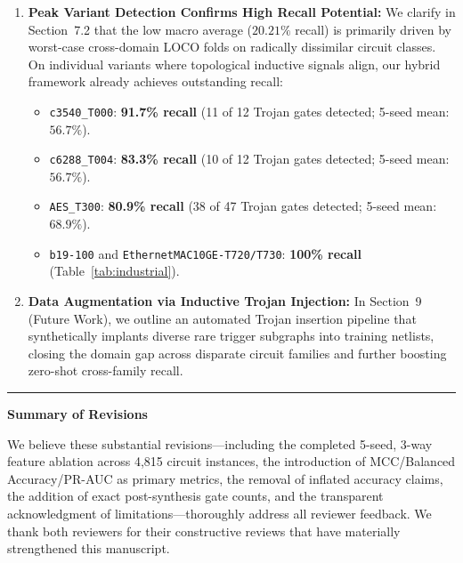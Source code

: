 \documentclass[11pt,a4paper]{article}
\begin{document}
\begin{enumerate}[leftmargin=*]
    \item \textbf{Peak Variant Detection Confirms High Recall Potential:}
    We clarify in Section~7.2 that the low macro average ($20.21\%$ recall) is primarily driven by worst-case cross-domain LOCO folds on radically dissimilar circuit classes. On individual variants where topological inductive signals align, our hybrid framework already achieves outstanding recall:
    \begin{itemize}
        \item \texttt{c3540\_T000}: \textbf{91.7\% recall} (11 of 12 Trojan gates detected; 5-seed mean: $56.7\%$).
        \item \texttt{c6288\_T004}: \textbf{83.3\% recall} (10 of 12 Trojan gates detected; 5-seed mean: $56.7\%$).
        \item \texttt{AES\_T300}: \textbf{80.9\% recall} (38 of 47 Trojan gates detected; 5-seed mean: $68.9\%$).
        \item \texttt{b19-100} and \texttt{EthernetMAC10GE-T720/T730}: \textbf{100\% recall} (Table~\ref{tab:industrial}).
    \end{itemize}

    \item \textbf{Data Augmentation via Inductive Trojan Injection:}
    In Section~9 (Future Work), we outline an automated Trojan insertion pipeline that synthetically implants diverse rare trigger subgraphs into training netlists, closing the domain gap across disparate circuit families and further boosting zero-shot cross-family recall.
\end{enumerate}

\vspace{12pt}
\rule{\textwidth}{1pt}
\begin{center}
    \textbf{Summary of Revisions}
\end{center}

We believe these substantial revisions---including the completed 5-seed, 3-way feature ablation across 4,815 circuit instances, the introduction of MCC/Balanced Accuracy/PR-AUC as primary metrics, the removal of inflated accuracy claims, the addition of exact post-synthesis gate counts, and the transparent acknowledgment of limitations---thoroughly address all reviewer feedback. We thank both reviewers for their constructive reviews that have materially strengthened this manuscript.
\end{document}
